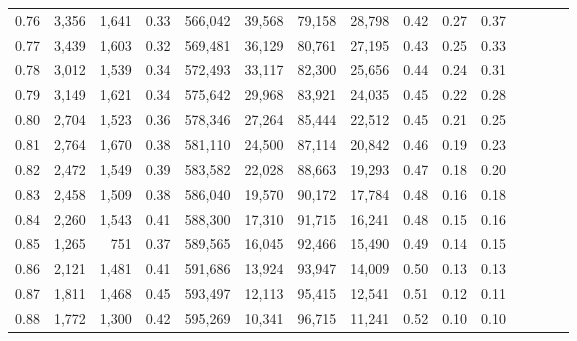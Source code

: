 \begin{tabular}{rrrcrrrrrrrrrrr}
0.76 &   3,356 &  1,641 &                                       0.33 &  566,042 &   39,568 &   79,158 &   28,798 &  0.42 &  0.27 &                         0.37 \\
0.77 &   3,439 &  1,603 &                                       0.32 &  569,481 &   36,129 &   80,761 &   27,195 &  0.43 &  0.25 &                         0.33 \\
0.78 &   3,012 &  1,539 &                                       0.34 &  572,493 &   33,117 &   82,300 &   25,656 &  0.44 &  0.24 &                         0.31 \\
0.79 &   3,149 &  1,621 &                                       0.34 &  575,642 &   29,968 &   83,921 &   24,035 &  0.45 &  0.22 &                         0.28 \\
0.80 &   2,704 &  1,523 &                                       0.36 &  578,346 &   27,264 &   85,444 &   22,512 &  0.45 &  0.21 &                         0.25 \\
0.81 &   2,764 &  1,670 &                                       0.38 &  581,110 &   24,500 &   87,114 &   20,842 &  0.46 &  0.19 &                         0.23 \\
0.82 &   2,472 &  1,549 &                                       0.39 &  583,582 &   22,028 &   88,663 &   19,293 &  0.47 &  0.18 &                         0.20 \\
0.83 &   2,458 &  1,509 &                                       0.38 &  586,040 &   19,570 &   90,172 &   17,784 &  0.48 &  0.16 &                         0.18 \\
0.84 &   2,260 &  1,543 &                                       0.41 &  588,300 &   17,310 &   91,715 &   16,241 &  0.48 &  0.15 &                         0.16 \\
0.85 &   1,265 &    751 &                                       0.37 &  589,565 &   16,045 &   92,466 &   15,490 &  0.49 &  0.14 &                         0.15 \\
0.86 &   2,121 &  1,481 &                                       0.41 &  591,686 &   13,924 &   93,947 &   14,009 &  0.50 &  0.13 &                         0.13 \\
0.87 &   1,811 &  1,468 &                                       0.45 &  593,497 &   12,113 &   95,415 &   12,541 &  0.51 &  0.12 &                         0.11 \\
0.88 &   1,772 &  1,300 &                                       0.42 &  595,269 &   10,341 &   96,715 &   11,241 &  0.52 &  0.10 &                         0.10 \\

\end{tabular}

